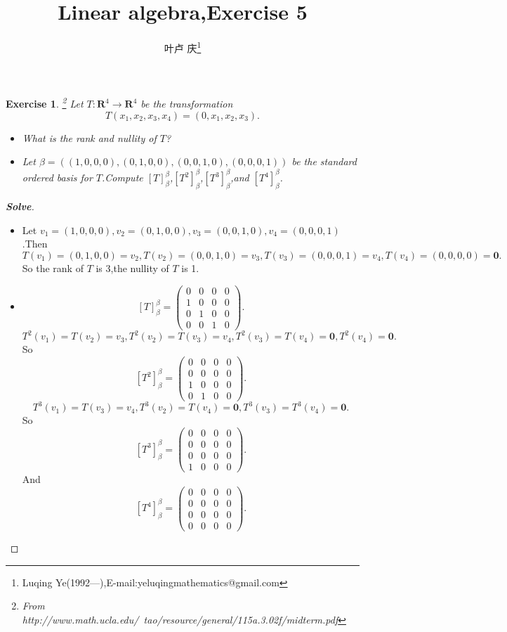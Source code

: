 \documentclass[a4paper]{article}
\newtheorem*{exe}{Exercise}
\newenvironment{exercise}
{\bigskip\begin{mdframed}\begin{exe}}
    {\end{exe}\end{mdframed}\bigskip}
\begin{document}
\title{\huge{\bf{Linear algebra,Exercise 5}}} \author{\small{叶卢
    庆\footnote{Luqing
      Ye(1992---),E-mail:yeluqingmathematics@gmail.com}}}
\maketitle
\begin{exercise}\footnote{From
    http://www.math.ucla.edu/~tao/resource/general/115a.3.02f/midterm.pdf}
Let $T:\mathbf{R}^4\to \mathbf{R}^4$ be the transformation
$$
T(x_1,x_2,x_3,x_4)=(0,x_1,x_2,x_3).
$$
\begin{itemize}
\item What is the rank and nullity of $T$?
\item Let $\beta=((1,0,0,0),(0,1,0,0),(0,0,1,0),(0,0,0,1))$ be the
  standard ordered basis for $T$.Compute
  $[T]_{\beta}^{\beta}$,$[T^2]_{\beta}^{\beta}$,$[T^3]_{\beta}^{\beta}$,and
  $[T^4]_{\beta}^{\beta}$.
\end{itemize}
\end{exercise}
\begin{proof}[\textbf{Solve}]
  \begin{itemize}
  \item Let $v_1=(1,0,0,0),v_2=(0,1,0,0),v_3=(0,0,1,0),v_4=(0,0,0,1)$.Then
$$
T(v_1)=(0,1,0,0)=v_2,T(v_2)=(0,0,1,0)=v_3,T(v_3)=(0,0,0,1)=v_4,T(v_4)=(0,0,0,0)=\mathbf{0}.
$$
So the rank of $T$ is 3,the nullity of $T$ is 1.
\item
$$
[T]_{\beta}^{\beta}=\begin{pmatrix}
  0&0&0&0\\
1&0&0&0\\
0&1&0&0\\
0&0&1&0
\end{pmatrix}.
$$
$$
T^2(v_1)=T(v_2)=v_3,T^2(v_2)=T(v_3)=v_4,T^2(v_3)=T(v_4)=\mathbf{0},T^2(v_4)=\mathbf{0}.
$$
So
$$
[T^2]_{\beta}^{\beta}=\begin{pmatrix}
  0&0&0&0\\
0&0&0&0\\
1&0&0&0\\
0&1&0&0
\end{pmatrix}.
$$
$$
T^3(v_1)=T(v_3)=v_4,T^3(v_2)=T(v_4)=\mathbf{0},T^3(v_3)=T^3(v_4)=\mathbf{0}.
$$
So
$$
[T^3]_{\beta}^{\beta}=\begin{pmatrix}
  0&0&0&0\\
0&0&0&0\\
0&0&0&0\\
1&0&0&0
\end{pmatrix}.
$$
And
$$
[T^4]_{\beta}^{\beta}=\begin{pmatrix}
  0&0&0&0\\
0&0&0&0\\
0&0&0&0\\
0&0&0&0
\end{pmatrix}.
$$
\end{itemize}
\end{proof}
\end{document}
